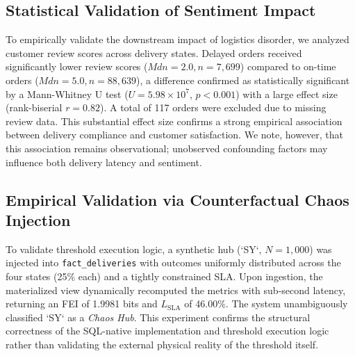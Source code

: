 \documentclass[conference]{IEEEtran}
\begin{document}
\subsection{Statistical Validation of Sentiment Impact}
To empirically validate the downstream impact of logistics disorder, we analyzed customer review scores across delivery states. Delayed orders received significantly lower review scores ($Mdn = 2.0, n = 7,699$) compared to on-time orders ($Mdn = 5.0, n = 88,639$), a difference confirmed as statistically significant by a Mann-Whitney U test ($U = 5.98 \times 10^7$, $p < 0.001$) with a large effect size (rank-biserial $r = 0.82$). A total of 117 orders were excluded due to missing review data. This substantial effect size confirms a strong empirical association between delivery compliance and customer satisfaction. We note, however, that this association remains observational; unobserved confounding factors may influence both delivery latency and sentiment.

\subsection{Empirical Validation via Counterfactual Chaos Injection}
To validate threshold execution logic, a synthetic hub (`SY`, $N=1,000$) was injected into \texttt{fact\_deliveries} with outcomes uniformly distributed across the four states (25\% each) and a tightly constrained SLA. Upon ingestion, the materialized view dynamically recomputed the metrics with sub-second latency, returning an FEI of 1.9981 bits and $L_{\text{SLA}}$ of 46.00\%. The system unambiguously classified `SY` as a \textit{Chaos Hub}. This experiment confirms the structural correctness of the SQL-native implementation and threshold execution logic rather than validating the external physical reality of the threshold itself.
\end{document}
